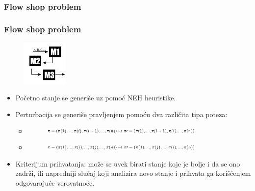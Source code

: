 \documentclass{beamer}
\begin{document}
\subsubsection{Flow shop problem}
\begin{frame}[fragile]\frametitle{Flow shop problem}
\begin{figure}[h!]
  \centering
  \includegraphics[width=0.2\textwidth]{flowshop.png}
  \label{figure:fsp}
\end{figure}
\begin{itemize}
  \item Početno stanje se generiše uz pomoć NEH heuristike.
  \item Perturbacija se generiše pravljenjem pomoću dva različita tipa poteza: \\
	\begin{itemize}
 		 \item \begin{figure}[h!]
 			 \centering
  			 \includegraphics[width=0.8\textwidth]{f1.png}
		            \label{figure:f1}
			  \end{figure}
		\item \begin{figure}[h!]
 			 \centering
  			 \includegraphics[width=0.8\textwidth]{f2.png}
		            \label{figure:f2}
			  \end{figure}
	\end{itemize}
  \item Kriterijum prihvatanja: može se uvek birati stanje koje je bolje i da se ono zadrži, ili napredniji slučaj koji analizira novo stanje i prihvata ga korišćenjem odgovarajuće verovatnoće.
\end{itemize}
\end{frame}
\end{document}
